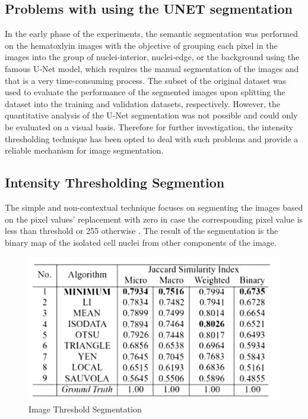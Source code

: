 \subsection{Problems with using the UNET segmentation }
In the early phase of the experiments, the semantic segmentation was performed on the hematoxlyin images with the objective of grouping each pixel in the images into the group of nuclei-interior, nuclei-edge, or the background using the famous U-Net model, which requires the manual segmentation of the images and that is a very time-consuming process. The subset of the original dataset was used to evaluate the performance of the segmented images upon splitting the dataset into the training and validation datasets, respectively. However, the quantitative analysis of the U-Net segmentation was not possible and could only be evaluated on a visual basis. Therefore for further investigation, the intensity thresholding technique has been opted to deal with such problems and provide a reliable mechanism for image segmentation.
\subsection{Intensity Thresholding Segmention}

The simple and non-contextual technique focuses on segmenting the images based on the pixel values' replacement with zero in case the corresponding pixel value is less than threshold or 255 otherwise \citep{lectureimagesegmentation}. 
The result of the segmentation is the binary map of the isolated cell nuclei from other components of the image.

\begin{figure}[!htp]
    \centering
    \includegraphics[scale=0.2]{assets/JaccardSimilarity.png}
    \caption{Image Threshold Segmentation}
    \label{fig:jaccardmetrics}
\end{figure} 


